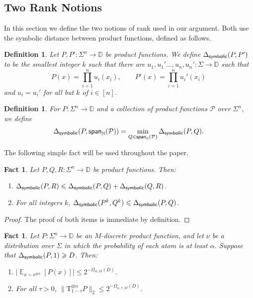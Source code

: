 \documentclass[11pt]{article}
\newtheorem{fact}[thm]{Fact}
\newtheorem{definition}[thm]{Definition}
\newcommand\card[1]{\left| {#1} \right|}
\newcommand\norm[1]{\| #1 \|}
\newcommand\Expect[2]{{\mathop{\mathbb{E}}_{#1}\left[ {#2} \right]}}
\newcommand\spn{{\sf span}_{\mathbb{N}}}
\renewcommand\geq{\geqslant}
\renewcommand\leq{\leqslant}
\begin{document}
\subsection{Two Rank Notions}
In this section we define the two notions of rank used in our argument. Both use the symbolic distance between product functions, defined as follows.
\begin{definition}
    Let $P,P'\colon \Sigma^n\to\mathbb{D}$ be product functions. We define $\Delta_{{\sf symbolic}}(P,P')$ to be the smallest integer $k$ such that there are $u_1,u_1'\ldots,u_n,u_n'\colon \Sigma\to\mathbb{D}$ such that 
    \[
    P(x) = \prod\limits_{i=1}^{n}u_i(x_i),
    \qquad
    P'(x) = \prod\limits_{i=1}^{n}u_i'(x_i)
    \]
    and $u_i=u_i'$ for all but $k$ of $i\in [n]$.
\end{definition}
\begin{definition}
    For $P\colon\Sigma^{n}\to\mathbb{D}$ and a collection of product functions $\mathcal{P}$ over $\Sigma^n$, we define 
    \[
    \Delta_{{\sf symbolic}}(P,\spn(\mathcal{P}))
    =\min_{Q\in\spn(\mathcal{P})}\Delta_{{\sf symbolic}}(P,Q).
    \]
\end{definition}
The following simple fact will be used throughout the paper.
\begin{fact}\label{fact:symb_dist_prop}
    Let $P,Q,R\colon \Sigma^{n}\to\mathbb{D}$ be product functions. Then:
    \begin{enumerate}
        \item $\Delta_{{\sf symbolic}}(P,R)\leq \Delta_{{\sf symbolic}}(P,Q)+\Delta_{{\sf symbolic}}(Q,R)$.
        \item For all integers $k$, 
        $\Delta_{{\sf symbolic}}(P^k,Q^k)\leq \Delta_{{\sf symbolic}}(P,Q)$.
    \end{enumerate}
\end{fact}
\begin{proof}
    The proof of both items is immediate by definition.
\end{proof}
\begin{fact} \label{fact:highrankdecay}
    Let $P\colon \Sigma^n\to\mathbb{D}$ be an $M$-discrete product function, and let $\nu$ be a distribution over $\Sigma$ in which the probability of each atom is at least $\alpha$. Suppose that $\Delta_{{\sf symbolic}}(P,1)\geq D$. Then:
    \begin{enumerate}
        \item 
        $\card{\Expect{x\sim\nu^{\otimes n}}{P(x)}}\leq 2^{-\Omega_{\alpha, M}(D)}$.
        \item For all $\tau>0$, $\norm{\mathrm{T}_{1-\tau}^{\otimes n}
        P}_2\leq 2^{-\Omega_{\alpha,\tau, M}(D)}$.
    \end{enumerate}
\end{fact}
\end{document}
